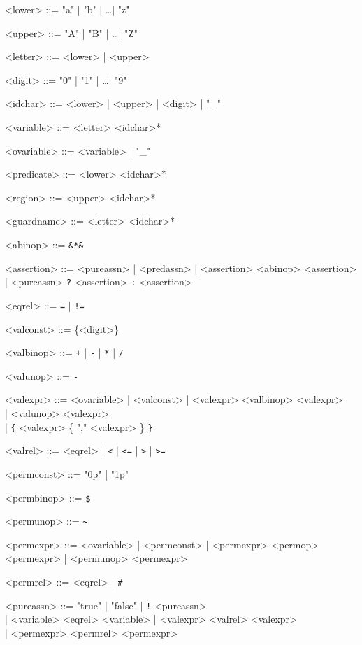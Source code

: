 \documentclass[a4paper]{article}
\begin{document}
\begin{grammar}
  <lower> ::= "a" | "b" | \ldots | "z"

  <upper> ::= "A" | "B" | \ldots | "Z"

  <letter> ::= <lower> | <upper>

  <digit> ::= "0" | "1" | \ldots | "9"

  <idchar> ::= <lower> | <upper> | <digit> | "_"

  <variable> ::= <letter> <idchar>*

  <ovariable> ::= <variable> | "_"

  <predicate> ::= <lower> <idchar>*

  <region> ::= <upper> <idchar>*

  <guardname> ::= <letter> <idchar>*

  <abinop> ::= \verb|&*&|

  <assertion> ::= <pureassn> | <predassn> | <assertion> <abinop> <assertion> \\
              | {\color{blue} <pureassn> \verb|?| <assertion> \verb|:| <assertion>}


  <eqrel> ::= \verb|=| | \verb|!=|

  <valconst> ::= \{<digit>\}

  <valbinop> ::= \verb|+| | \verb|-| | \verb|*| | {\color{blue} \verb|/|}

  <valunop> ::= \verb|-|

  <valexpr> ::= <ovariable> | <valconst> | <valexpr> <valbinop> <valexpr> \\
    | <valunop> <valexpr> \\
    | {\color{blue} \verb|{| <valexpr> \{ "," <valexpr> \} \verb|}| }

  <valrel> ::= <eqrel> | \verb|<| | \verb|<=| | \verb|>| | \verb|>=|

  <permconst> ::= "0p" | "1p"

  <permbinop> ::= \verb|$|

  <permunop> ::= \verb|~|

  <permexpr> ::= <ovariable> | <permconst> | <permexpr> <permop> <permexpr> | <permunop> <permexpr>

  <permrel> ::= <eqrel> | \verb|#|

  <pureassn> ::= "true" | "false" | \verb|!| <pureassn> \\
    | <variable> <eqrel> <variable>
    | <valexpr> <valrel> <valexpr> \\
    | <permexpr> <permrel> <permexpr>


\end{grammar}
\end{document}
